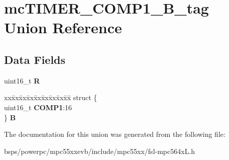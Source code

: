 \hypertarget{unionmcTIMER__COMP1__16B__tag}{}\section{mc\+T\+I\+M\+E\+R\+\_\+\+C\+O\+M\+P1\+\_\+B\+\_\+tag Union Reference}
\label{unionmcTIMER__COMP1__16B__tag}
\subsection*{Data Fields}
\begin{DoxyCompactItemize}
\item 
\mbox{\label{unionmcTIMER__COMP1__16B__tag_a2b0f1f958aae7f8507a19a7044d3a12e}} 
uint16\+\_\+t {\bfseries R}
\item 
\mbox{\label{unionmcTIMER__COMP1__16B__tag_afa927c3745db2e31157fada647793363}} 
\begin{tabbing}
xx\=xx\=xx\=xx\=xx\=xx\=xx\=xx\=xx\=\kill
struct \{\\
\>uint16\_t {\bfseries COMP1}:16\\
\} {\bfseries B}\\

\end{tabbing}\end{DoxyCompactItemize}


The documentation for this union was generated from the following file\+:\begin{DoxyCompactItemize}
\item 
bsps/powerpc/mpc55xxevb/include/mpc55xx/fsl-\/mpc564x\+L.\+h\end{DoxyCompactItemize}
